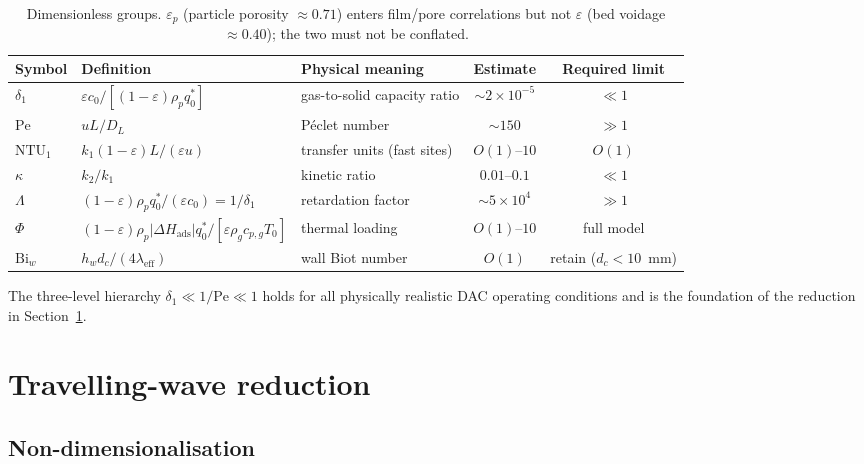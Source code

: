 \documentclass[a4paper]{amsart}
\theoremstyle{definition}
\begin{document}
\begin{table}[ht]
\centering
\caption{Dimensionless groups.
  $\varepsilon_p$ (particle porosity $\approx0.71$) enters film/pore correlations
  but not $\varepsilon$ (bed voidage $\approx0.40$); the two must not be
  conflated.}
\label{tab:dimless}
\renewcommand{\arraystretch}{1.2}
\begin{tabular}{@{}lllcc@{}}
\toprule
Symbol & Definition & Physical meaning & Estimate & Required limit \\
\midrule
$\delta_1$ & $\varepsilon c_0/[(1-\varepsilon)\rho_p q_0^*]$
  & gas-to-solid capacity ratio & $\sim2\times10^{-5}$ & $\ll1$ \\
$\mathrm{Pe}$ & $uL/D_L$
  & P\'eclet number & $\sim150$ & $\gg1$ \\
$\mathrm{NTU}_1$ & $k_1(1-\varepsilon)L/(\varepsilon u)$
  & transfer units (fast sites) & $O(1)$--$10$ & $O(1)$ \\
$\kappa$ & $k_2/k_1$
  & kinetic ratio & $0.01$--$0.1$ & $\ll1$ \\
$\Lambda$ & $(1-\varepsilon)\rho_p q_0^*/(\varepsilon c_0) = 1/\delta_1$
  & retardation factor & $\sim5\times10^{4}$ & $\gg1$ \\
$\Phi$ & $(1-\varepsilon)\rho_p|\Delta H_\text{ads}|q_0^*/
         [\varepsilon\rho_g c_{p,g}T_0]$
  & thermal loading & $O(1)$--$10$ & full model \\
$\mathrm{Bi}_w$ & $h_w d_c/(4\lambda_\text{eff})$
  & wall Biot number & $O(1)$ & retain ($d_c<10$~mm) \\
\bottomrule
\end{tabular}
\end{table}

The three-level hierarchy $\delta_1\ll 1/\mathrm{Pe}\ll 1$ holds for all
physically realistic DAC operating conditions and is the foundation of the
reduction in Section~\ref{sec:wave}.

\section{Travelling-wave reduction}
\label{sec:wave}

\subsection{Non-dimensionalisation}
\end{document}
